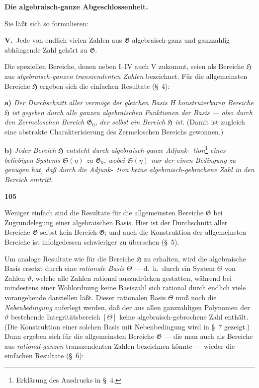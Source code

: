 \documentclass[12pt,a4paper]{article}
\begin{document}
\begin{center}
\textbf{Die algebraisch-ganze Abgeschlossenheit.}
\end{center}

Sie l\"a\ss t sich so formulieren:

\smallskip
\textbf{V.}\ Jede von endlich vielen Zahlen aus $\mathfrak{G}$ algebraisch-ganz und ganzzahlig abh\"angende Zahl geh\"ort zu $\mathfrak{G}$.

\smallskip
Die speziellen Bereiche, denen neben I--IV auch V zukommt, seien als Bereiche $\mathfrak{H}$ aus \emph{algebraisch-ganzen transzendenten Zahlen} bezeichnet. F\"ur die allgemeinsten Bereiche $\mathfrak{H}$ ergeben sich die einfachen Resultate (\S\ 4):

\smallskip
\textbf{a)} \emph{Der Durchschnitt aller verm\"oge der gleichen Basis $H$ konstruierbaren Bereiche $\mathfrak{H}$ ist gegeben durch alle ganzen algebraischen Funktionen der Basis --- also durch den Zermeloschen Bereich $\mathfrak{G}_0$, der selbst ein Bereich $\mathfrak{H}$ ist.} (Damit ist zugleich eine abstrakte Charakterisierung des Zermeloschen Bereichs gewonnen.)

\smallskip
\textbf{b)} \emph{Jeder Bereich $\mathfrak{H}$ entsteht durch algebraisch-ganze Adjunk-\ tion}\footnote{Erkl\"arung des Ausdrucks in \S\ 4.} \emph{eines beliebigen Systems $\mathfrak{S}(\eta)$ zu $\mathfrak{G}_0$, wobei $\mathfrak{S}(\eta)$ nur der einen Bedingung zu gen\"ugen hat, da\ss{} durch die Adjunk-\ tion keine algebraisch-gebrochene Zahl in den Bereich eintritt.}

\newpage
\begin{center}
\textbf{105}
\end{center}

Weniger einfach sind die Resultate f\"ur die allgemeinsten Bereiche $\mathfrak{G}$ bei Zugrundelegung einer algebraischen Basis. Hier ist der Durchschnitt aller Bereiche $\mathfrak{G}$ selbst kein Bereich $\mathfrak{G}$; und auch die Konstruktion der allgemeinsten Bereiche ist infolgedessen schwieriger zu \"ubersehen (\S\ 5).

Um analoge Resultate wie f\"ur die Bereiche $\mathfrak{H}$ zu erhalten, wird die algebraische Basis ersetzt durch eine \emph{rationale Basis} $\Theta$ --- d.\ h.\ durch ein System $\Theta$ von Zahlen $\vartheta$, welche alle Zahlen rational auszudr\"ucken gestatten, w\"ahrend bei mindestens einer Wohlordnung keine Basiszahl sich rational durch endlich viele vorangehende darstellen l\"a\ss t. Dieser rationalen Basis $\Theta$ mu\ss{} noch die \emph{Nebenbedingung} auferlegt werden, da\ss{} der aus allen ganzzahligen Polynomen der $\vartheta$ bestehende Integrit\"atsbereich $[\Theta]$ keine algebraisch-gebrochene Zahl enth\"alt. (Die Konstruktion einer solchen Basis mit Nebenbedingung wird in \S\ 7 gezeigt.) Dann ergeben sich f\"ur die allgemeinsten Bereiche $\mathfrak{G}$ --- die man auch als Bereiche aus \emph{rational-ganzen} transzendenten Zahlen bezeichnen k\"onnte --- wieder die einfachen Resultate (\S\ 6):
\end{document}
